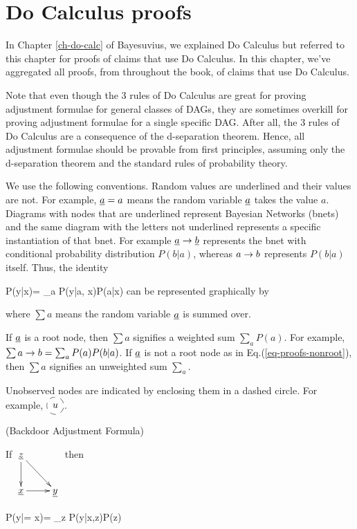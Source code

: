 \chapter{Do Calculus proofs}
\label{ch-do-calc-proofs}

In Chapter \ref{ch-do-calc}
of Bayesuvius,
we explained Do Calculus
but referred to this
chapter for proofs
of claims that
use Do Calculus.
In this chapter, we've
aggregated
 all proofs, from
throughout the book,
of claims that use Do Calculus.

Note that even though the 3
rules of Do Calculus
are great for proving
adjustment formulae
for general classes of DAGs,
they are sometimes overkill
for proving
 adjustment formulae
for a single specific DAG.
After all,  the
 3 rules of Do Calculus
are a consequence
of the d-separation theorem.
Hence, all adjustment
formulae should be
provable from first principles,
assuming only
the d-separation theorem
and the standard rules of
probability theory.

We use the
 following conventions.
Random values are underlined
and their values are not.
For example, ${\underline{a}}=a$ means
the random variable
${\underline{a}}$ takes the value $a$.
Diagrams
with nodes that are
underlined represent
Bayesian Networks (bnets)
and the same diagram
with the letters not underlined
represents a specific
instantiation of that bnet.
For example ${\underline{a}}\rightarrow{\underline{b}}$
represents the bnet with
conditional probability distribution
$P(b|a)$,
whereas  $a\rightarrow b$
represents $P(b|a)$ itself.
Thus, the identity

\beq
P(y|x)= \sum_a P(y|a, x)P(a|x)
\eeq
can be represented graphically
by

\beq
{}
\label{eq-proofs-nonroot}
\eeq
where $\sum a$
means the random variable
${\underline{a}}$ is summed over.

If ${\underline{a}}$ is a root node,
then $\sum a$ signifies
a weighted sum $\sum_a P(a)$.
For example, $\sum a\rightarrow b=\sum_a P(a)P(b|a)$.
If ${\underline{a}}$ is not
a root node
as in Eq.(\ref{eq-proofs-nonroot}), then
$\sum a$ signifies
an unweighted sum $\sum_a$.

Unobserved nodes are
indicated by enclosing them
in a dashed circle. For example,
$\xymatrix{*++[F-o]{u}}$.

\begin{claim} (Backdoor
Adjustment Formula)
\label{cl-backdoor-proof}

If
$
\xymatrix{
{\rvz}\ar[d]\ar[rd]
\\
\rvx\ar[r]&\rvy
}$
then

\beq
P(y|\cald \rvx = x)=
\sum_z
P(y|x,z)P(z)
\eeq
\beq
{}
\eeq
\end{claim}

